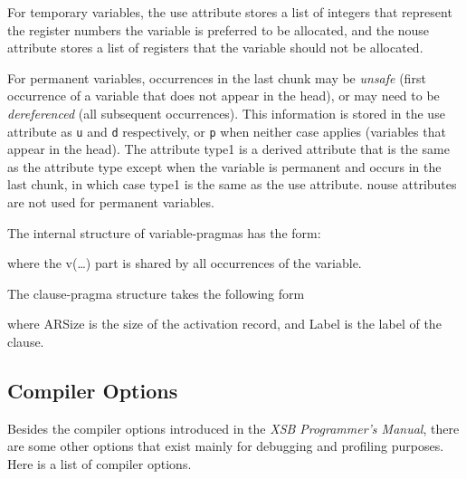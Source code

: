 For temporary variables, the {\sf use} attribute stores a list of
integers that represent the register numbers the variable is preferred
to be allocated, and the {\sf nouse} attribute stores a list of 
registers that the variable should not be allocated.

For permanent variables, occurrences in the last chunk may be
{\it unsafe} (first occurrence of a variable that does not appear in
the head), or may need to be {\it dereferenced} (all subsequent
occurrences).  This information is stored in the {\sf use} attribute
as {\tt u} and {\tt d} respectively, or {\tt p} when neither case
applies (variables that appear in the head).  The attribute
{\sf type1} is a derived attribute that is the same as the attribute
{\sf type} except when the variable is permanent and occurs in the
last chunk, in which case {\sf type1} is the same as the {\sf use}
attribute.  {\sf nouse} attributes are not used for permanent
variables.

The internal structure of variable-pragmas has the form:


where the {\sf v(\ldots)} part is shared by all occurrences of
the variable.

The clause-pragma structure takes the following form


where {\sf ARSize} is the size of the activation record, and {\sf Label}
is the label of the clause.



\subsection{Compiler Options}

Besides the compiler options introduced in the {\it XSB Programmer's Manual},
there are some other options that exist mainly for debugging and profiling
purposes.  Here is a list of compiler options.

